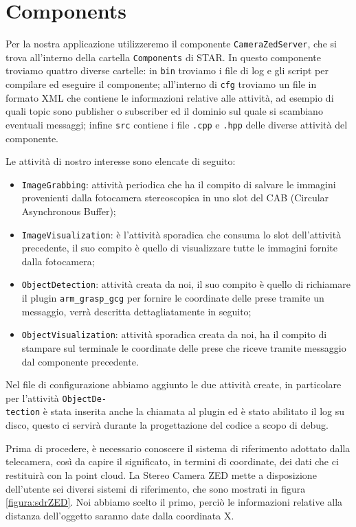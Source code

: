 \documentclass{report}
\begin{document}
\section{Components}
Per la nostra applicazione utilizzeremo il componente \texttt{CameraZedServer}, che si trova all'interno della cartella \texttt{Components} di STAR. In questo componente troviamo quattro diverse cartelle: in \texttt{bin} troviamo i file di log e gli script per compilare ed eseguire il componente; all'interno di \texttt{cfg} troviamo un file in formato XML che contiene le informazioni relative alle attività, ad esempio di quali topic sono publisher o subscriber ed il dominio sul quale si scambiano eventuali messaggi; infine \texttt{src} contiene i file \texttt{.cpp} e \texttt{.hpp} delle diverse attività del componente. \par
\noindent Le attività di nostro interesse sono elencate di seguito:
\begin{itemize}
\item \texttt{ImageGrabbing}: attività periodica che ha il compito di salvare le immagini provenienti dalla fotocamera stereoscopica in uno slot del CAB (Circular Asynchronous Buffer);
\item \texttt{ImageVisualization}: è l'attività sporadica che consuma lo slot dell'attività precedente, il suo compito è quello di visualizzare tutte le immagini fornite dalla fotocamera;
\item \texttt{ObjectDetection}: attività  creata da noi, il suo compito è quello di richiamare il plugin \texttt{arm\_grasp\_gcg} per fornire le coordinate delle prese tramite un messaggio, verrà descritta dettagliatamente in seguito;
\item \texttt{ObjectVisualization}: attività sporadica creata da noi, ha il compito di stampare sul terminale le coordinate delle prese che riceve tramite messaggio dal componente precedente.
\end{itemize}
Nel file di configurazione abbiamo aggiunto le due attività create, in particolare per l'attività \texttt{ObjectDe-}\\\texttt{tection} è stata inserita anche la chiamata al plugin ed è stato abilitato il log su disco, questo ci servirà durante la progettazione del codice a scopo di debug. \par
Prima di procedere, è necessario conoscere il sistema di riferimento adottato dalla telecamera, così da capire il significato, in termini di coordinate, dei dati che ci restituirà con la point cloud. La Stereo Camera ZED mette a disposizione dell'utente sei diversi sistemi di riferimento, che sono mostrati in figura \ref{figura:sdrZED}. Noi abbiamo scelto il primo, perciò le informazioni relative alla distanza dell'oggetto saranno date dalla coordinata X. 
\end{document}
